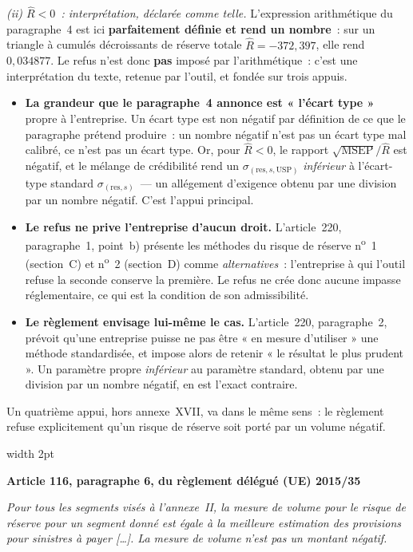 \documentclass[a4paper,11pt]{article}
\newcommand{\reglement}[2]{%
  \par\vspace{2mm}\noindent\begin{minipage}{\linewidth}
  \small\setlength{\parindent}{0pt}
  \textcolor{financeblue}{\vrule width 2pt}\hspace{4mm}%
  \begin{minipage}{\dimexpr\linewidth-7mm\relax}
  \textcolor{financeblue}{\textbf{#1}}
  \par\vspace{2pt}
  {\itshape #2}
  \end{minipage}
  \end{minipage}\par\vspace{3mm}}
\begin{document}
\emph{(ii) $\hat R < 0$~: interprétation, déclarée comme telle.} L'expression
arithmétique du paragraphe~4 est ici \textbf{parfaitement définie et rend un
nombre}~: sur un triangle à cumulés décroissants de réserve totale
$\hat R = -372{,}397$, elle rend $0{,}034877$. Le refus n'est donc
\textbf{pas} imposé par l'arithmétique~: c'est une interprétation du texte,
retenue par l'outil, et fondée sur trois appuis.

\begin{itemize}[itemsep=2pt]
\item \textbf{La grandeur que le paragraphe~4 annonce est « l'écart type »}
  propre à l'entreprise. Un écart type est non négatif par définition de ce que
  le paragraphe prétend produire~: un nombre négatif n'est pas un écart type mal
  calibré, ce n'est pas un écart type. Or, pour $\hat R < 0$, le rapport
  $\sqrt{\mathrm{MSEP}}/\hat R$ est négatif, et le mélange de crédibilité rend un
  $\sigma_{(\text{res},s,\mathrm{USP})}$ \emph{inférieur} à l'écart-type standard
  $\sigma_{(\text{res},s)}$~--- un allégement d'exigence obtenu par une division
  par un nombre négatif. C'est l'appui principal.
\item \textbf{Le refus ne prive l'entreprise d'aucun droit.} L'article~220,
  paragraphe~1, point~b) présente les méthodes du risque de réserve
  n\textsuperscript{o}~1 (section~C) et n\textsuperscript{o}~2 (section~D) comme
  \emph{alternatives}~: l'entreprise à qui l'outil refuse la seconde conserve la
  première. Le refus ne crée donc aucune impasse réglementaire, ce qui est la
  condition de son admissibilité.
\item \textbf{Le règlement envisage lui-même le cas.} L'article~220,
  paragraphe~2, prévoit qu'une entreprise puisse ne pas être « en mesure
  d'utiliser » une méthode standardisée, et impose alors de retenir « le résultat
  le plus prudent ». Un paramètre propre \emph{inférieur} au paramètre standard,
  obtenu par une division par un nombre négatif, en est l'exact contraire.
\end{itemize}

Un quatrième appui, hors annexe~XVII, va dans le même sens~: le règlement refuse
explicitement qu'un risque de réserve soit porté par un volume négatif.

\reglement{Article 116, paragraphe 6, du règlement délégué (UE) 2015/35}{Pour
tous les segments visés à l'annexe~II, la mesure de volume pour le risque de
réserve pour un segment donné est égale à la meilleure estimation des provisions
pour sinistres à payer [\dots]. La mesure de volume n'est pas un montant
négatif.}
\end{document}
